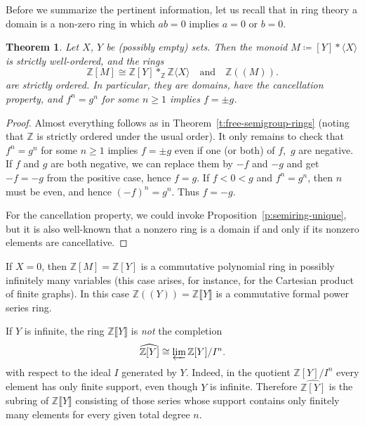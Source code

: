 \documentclass{amsart}
\theoremstyle{plain}
\newtheorem{theorem}[thm]{Theorem}
\theoremstyle{definition}
\newcommand{\bZ}{\mathbb Z}
\newcommand{\hmnser}[2]{{#1}(\!({#2})\!)}
\begin{document}
Before we summarize the pertinent information, let us recall that in ring theory a domain is  a non-zero ring in which $ab = 0$ implies $a = 0$ or $b = 0$.

\begin{theorem} \label{thm:main}
  Let $X$, $Y$ be \textup(possibly empty\textup) sets.
  Then the monoid $M\coloneqq [Y] * \langle X \rangle$ is strictly well-ordered, and the rings
  \[
  \bZ[M]\cong \bZ[Y] *_\bZ \bZ\langle X \rangle \quad\text{and}\quad \hmnser{\bZ}{M}.
  \]
  are strictly ordered.
  In particular, they are domains, have the cancellation property, and $f^n=g^n$ for some $n \ge 1$ implies $f=\pm g$.
\end{theorem}

\begin{proof}
  Almost everything follows as in Theorem~\ref{t:free-semigroup-rings} (noting that $\bZ$ is strictly ordered under the usual order).
  It only remains to check that $f^n = g^n$ for some $n \ge 1$ implies $f=\pm g$ even if one (or both) of $f$,~$g$ are negative.
  If $f$ and $g$ are both negative, we can replace them by $-f$ and $-g$ and get $-f=-g$ from the positive case, hence $f=g$.
  If $f < 0 < g$ and $f^n = g^n$, then $n$ must be even, and hence $(-f)^n=g^n$.
  Thus $f=-g$.

  For the cancellation property, we could invoke Proposition~\ref{p:semiring-unique}, but it is also well-known that a nonzero ring is a domain if and only if its nonzero elements are cancellative.
\end{proof}

If $X=0$, then $\bZ[M]=\bZ[Y]$ is a commutative polynomial ring in possibly infinitely many variables (this case arises, for instance, for the Cartesian product of finite graphs).
In this case $\hmnser{\bZ}{Y}=\bZ\llbracket Y \rrbracket$ is a commutative formal power series ring.

If $Y$ is infinite, the ring $\bZ\llbracket Y \rrbracket$ is \emph{not} the completion
\[
  \widehat{\bZ[Y]} \cong \varprojlim \bZ[Y] / I^n.
\]
with respect to the ideal $I$ generated by $Y$.
Indeed, in the quotient $\bZ[Y]/I^n$ every element has only finite support, even though $Y$ is infinite.
Therefore $\widehat{\bZ[Y]}$ is the subring of $\bZ\llbracket Y \rrbracket$ consisting of those series whose support contains only finitely many elements for every given total degree $n$.
\end{document}
